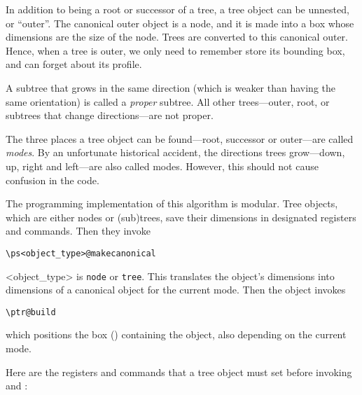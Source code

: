 \documentclass[11pt,english,BCOR10mm,DIV12,bibliography=totoc,parskip=false,smallheadings
    headexclude,footexclude,oneside]{pst-doc}
\begin{document}
In addition to being a root or successor of a tree, a tree object can be unnested, or ``outer''. 
The canonical outer object is a node, and it is made into a box whose dimensions are the size of the node. 
Trees are converted to this canonical outer. Hence, when a tree is outer, we only need to remember store its 
bounding box, and can forget about its profile.

A subtree that grows in the same direction (which is weaker than having the same orientation) is called a {\em proper} 
subtree. All other trees---outer, root, or subtrees that change directions---are not proper.

The three places a tree object can be found---root, successor or outer---are called {\em modes}. By an unfortunate 
historical accident, the directions trees grow---down, up, right and left---are also called modes. However, 
this should not cause confusion in the code.

The programming implementation of this algorithm is modular. Tree objects, which are either nodes or (sub)trees, 
save their dimensions in designated registers and commands. Then they invoke

\begin{lstlisting}[style=syntax]
  \ps<object_type>@makecanonical
\end{lstlisting}
<object\_type> is \verb=node= or \verb=tree=. This translates the object's dimensions into dimensions 
of a canonical object for the current mode. Then the object invokes

\begin{lstlisting}[style=syntax]
  \ptr@build
\end{lstlisting}

which positions the box () containing the object, also depending on the current mode.

Here are the registers and commands that a tree object must set before invoking  and 
:
\end{document}
